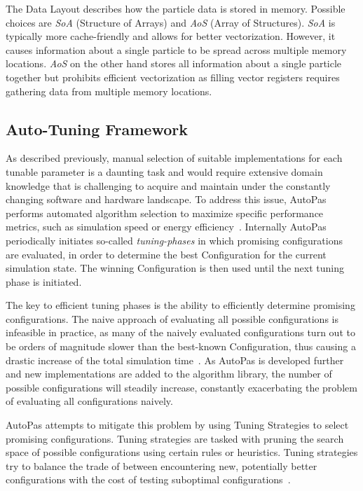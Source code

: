 \documentclass[conference]{IEEEtran}
\begin{document}
\begin{description}[style=nextline]
    \item[Data Layout]
        The Data Layout describes how the particle data is stored in memory. Possible choices are \textit{SoA} (Structure of Arrays) and \textit{AoS} (Array of Structures). \textit{SoA} is typically more cache-friendly and allows for better vectorization. However, it causes information about a single particle to be spread across multiple memory locations. \textit{AoS} on the other hand stores all information about a single particle together but prohibits efficient vectorization as filling vector registers requires gathering data from multiple memory locations.
\end{description}


\subsection{Auto-Tuning Framework}

As described previously, manual selection of suitable implementations for each tunable parameter is a daunting task and would require extensive domain knowledge that is challenging to acquire and maintain under the constantly changing software and hardware landscape. To address this issue, AutoPas performs automated algorithm selection to maximize specific performance metrics, such as simulation speed or energy efficiency~\cite{Gratl2022AutoPas}. Internally AutoPas periodically initiates so-called \textit{tuning-phases} in which promising configurations are evaluated, in order to determine the best Configuration for the current simulation state. The winning Configuration is then used until the next tuning phase is initiated.

The key to efficient tuning phases is the ability to efficiently determine promising configurations. The naive approach of evaluating all possible configurations is infeasible in practice, as many of the naively evaluated configurations turn out to be orders of magnitude slower than the best-known Configuration, thus causing a drastic increase of the total simulation time~\cite{endreport.pdf}\cite{Manuel_Lerchner_Thesis.pdf}.
As AutoPas is developed further and new implementations are added to the algorithm library, the number of possible configurations will steadily increase, constantly exacerbating the problem of evaluating all configurations naively.

AutoPas attempts to mitigate this problem by using Tuning Strategies to select promising configurations. Tuning strategies are tasked with pruning the search space of possible configurations using certain rules or heuristics. Tuning strategies try to balance the trade of between encountering new, potentially better configurations with the cost of testing suboptimal configurations~\cite{Newcome2023Poster}.
\end{document}
